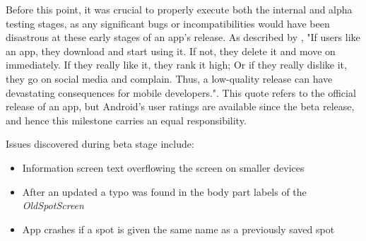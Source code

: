 Before this point, it was crucial to properly execute both the internal and alpha testing stages, as any significant bugs or incompatibilities would have been disastrous at these early stages of an app's release. As described by \cite{joorabchi2013real}, "If users like an app, they download and start using it. If not, they delete it and move on immediately. If they really like it, they rank it high; Or if they really dislike it, they go on social media and complain. Thus, a low-quality release can have devastating consequences for mobile developers.". This quote refers to the official release of an app, but Android's user ratings are available since the beta release, and hence this milestone carries an equal responsibility.

Issues discovered during beta stage include:
\begin{itemize}
    \item Information screen text overflowing the screen on smaller devices
    \item After an updated a typo was found in the body part labels of the \emph{OldSpotScreen}
    \item App crashes if a spot is given the same name as a previously saved spot
\end{itemize}

